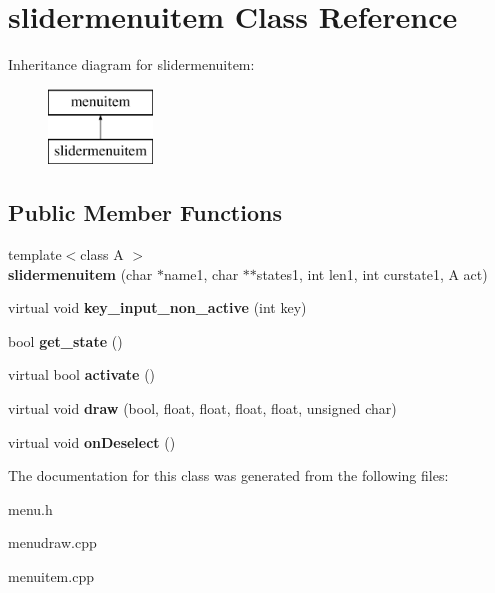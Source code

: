 \hypertarget{classslidermenuitem}{\section{slidermenuitem Class Reference}
\label{classslidermenuitem}
}
Inheritance diagram for slidermenuitem\-:\begin{figure}[H]
\begin{center}
\leavevmode
\includegraphics[height=2.000000cm]{classslidermenuitem}
\end{center}
\end{figure}
\subsection*{Public Member Functions}
\begin{DoxyCompactItemize}
\item 
\hypertarget{classslidermenuitem_a8d3ea3a2e8ffc77f6245f06403fb190b}{{\footnotesize template$<$class A $>$ }\\{\bfseries slidermenuitem} (char $\ast$name1, char $\ast$$\ast$states1, int len1, int curstate1, A act)}\label{classslidermenuitem_a8d3ea3a2e8ffc77f6245f06403fb190b}

\item 
\hypertarget{classslidermenuitem_acb7ab7077ab55851b6f9a0e45ebf5c56}{virtual void {\bfseries key\-\_\-input\-\_\-non\-\_\-active} (int key)}\label{classslidermenuitem_acb7ab7077ab55851b6f9a0e45ebf5c56}

\item 
\hypertarget{classslidermenuitem_ae07d0ff2b7111f833eeac63db401c2c7}{bool {\bfseries get\-\_\-state} ()}\label{classslidermenuitem_ae07d0ff2b7111f833eeac63db401c2c7}

\item 
\hypertarget{classslidermenuitem_a2e73d096c83aa1fb9f9a188a6c82c9a9}{virtual bool {\bfseries activate} ()}\label{classslidermenuitem_a2e73d096c83aa1fb9f9a188a6c82c9a9}

\item 
\hypertarget{classslidermenuitem_a62e992884ae1c6e4e44f1ebe5c84af5e}{virtual void {\bfseries draw} (bool, float, float, float, float, unsigned char)}\label{classslidermenuitem_a62e992884ae1c6e4e44f1ebe5c84af5e}

\item 
\hypertarget{classslidermenuitem_a5beb11932e734e3ee5285ff2d967d804}{virtual void {\bfseries on\-Deselect} ()}\label{classslidermenuitem_a5beb11932e734e3ee5285ff2d967d804}

\end{DoxyCompactItemize}


The documentation for this class was generated from the following files\-:\begin{DoxyCompactItemize}
\item 
menu.\-h\item 
menudraw.\-cpp\item 
menuitem.\-cpp\end{DoxyCompactItemize}

